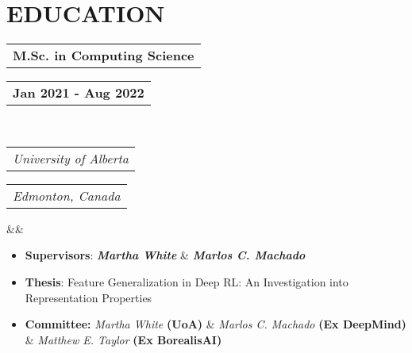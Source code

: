 \documentclass[11pt,a4paper,roman,colorlinks,linkcolor=blue,filecolor=magenta,urlcolor=cyan]{moderncv}        %
\makeatletter
\newcommand*{\customcventry}[7][.25em]{
  \begin{tabular}{@{}l} 
    {\bfseries #4}
  \end{tabular}
  \hfill%
  \begin{tabular}{l@{}}
     {\bfseries #5}
  \end{tabular} \\
  \begin{tabular}{@{}l} 
    {\itshape #3}
  \end{tabular}
  \hfill%
  \begin{tabular}{l@{}}
     {\itshape #2}
  \end{tabular}
  \ifx&#7&%
  \else{\\%
    \begin{minipage}{\maincolumnwidth}%
      \small#7%
    \end{minipage}}\fi%
  \par\addvspace{#1}}
\newcommand*{\customcvproject}[4][.25em]{%
  \begin{tabular}{@{}l} 
    {\bfseries #2} %
  \end{tabular}
  \hfill
  \begin{tabular}{l@{}}
    {#3} %
  \end{tabular}%
  \ifx&#4&%
  \else
    \\ %
    \begin{minipage}{\maincolumnwidth}%
      \small#4 %
    \end{minipage}%
  \fi
  \par\addvspace{#1}%
}
\makeatother
\begin{document}


\vspace{-2mm}


\section{EDUCATION}
{\customcventry{Edmonton, Canada}{University of Alberta}{M.Sc. in Computing Science}{Jan 2021 - Aug 2022}{}{}}
\begin{itemize}
    \item \textbf{Supervisors}: \textbf{\textit{Martha White}} \& \textbf{\textit{Marlos C. Machado}}
    \item \textbf{Thesis}: Feature Generalization in Deep RL: An Investigation into Representation Properties
    \item \textbf{Committee:} {\textit{Martha White}} \textbf{(UoA)} \& {\textit{Marlos C. Machado}} \textbf{(Ex DeepMind)} \& {\textit{Matthew E. Taylor} \textbf{(Ex BorealisAI)}}
\end{itemize}
\end{document}
